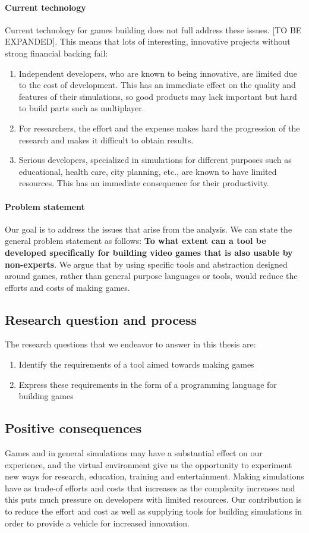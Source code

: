 \documentclass[10pt,a4paper]{article}
\begin{document}
\paragraph{Current technology}
Current technology for games building does not full address these issues. [TO BE EXPANDED].
This means that lots of interesting, innovative projects without strong financial backing fail:
\begin{enumerate}
\item Independent developers, who are known to being innovative, are limited due to the cost of development. This has an immediate effect on the quality and features of their simulations, so good products may lack important but hard to build parts such as multiplayer.
\item For researchers, the effort and the expense makes hard the progression of the research and makes it difficult to obtain results.
\item Serious developers, specialized in simulations for different purposes such as educational, health care, city planning, etc., are known to have limited resources. This has an immediate consequence for their productivity.
\end{enumerate}

\paragraph{Problem statement}
Our goal is to address the issues that arise from the analysis. We can state the general problem statement as follows: \textbf{To what extent can a tool be developed specifically for building video games that is also usable by non-experts}. We argue that by using specific tools and abstraction designed around games, rather than general purpose languages or tools, would reduce the efforts and costs of making games.

\subsection{Research question and process}
The research questions that we endeavor to answer in this thesis are:
\begin{enumerate}
\item Identify the requirements of a tool aimed towards making games
\item Express these requirements in the form of a programming language for building games
\end{enumerate}
\subsection{Positive consequences}
Games and in general simulations may have a substantial effect on our experience, and the virtual environment give us the opportunity to experiment new ways for research, education, training and entertainment. Making simulations have as trade-of efforts and costs that increases as the complexity increases and this puts much pressure on developers with limited resources.
Our contribution is to reduce the effort and cost as well as supplying tools for building simulations in order to provide a vehicle for increased innovation.
\end{document}
